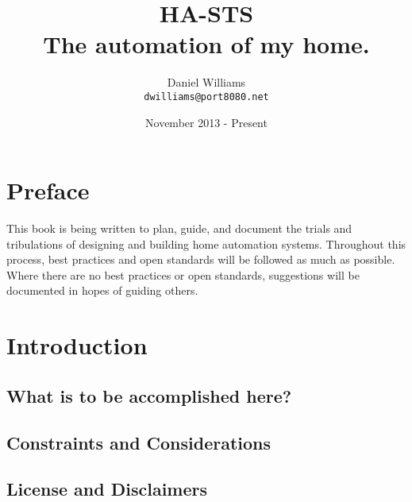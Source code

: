 \documentclass[letterpaper,twoside,12pt]{book}
\title{HA-STS \\ The automation of my home.}
\author{Daniel Williams \\ \texttt{dwilliams@port8080.net}}
\date{November 2013 - Present}
\begin{document}
\frontmatter
\maketitle

\chapter{Preface}
This book is being written to plan, guide, and document the trials and
tribulations of designing and building home automation systems.  Throughout
this process, best practices and open standards will be followed as much as
possible.  Where there are no best practices or open standards, suggestions will
be documented in hopes of guiding others.

\mainmatter
\tableofcontents

\chapter{Introduction}


\section{What is to be accomplished here?}

\section{Constraints and Considerations}

\section{License and Disclaimers}


\end{document}
